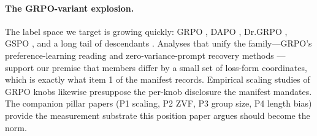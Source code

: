 \paragraph{The GRPO-variant explosion.} The label space we target is growing
quickly: GRPO \citep{shao2024deepseekmath, guo2025deepseekr1}, DAPO
\citep{yu2025dapo}, Dr.GRPO \citep{tong2025drgrpo}, GSPO \citep{qwen2025gspo},
and a long tail of descendants \citep{liu2026gdpo, nan2025ngrpo,
zhang2025scaffgrpo, lu2025grpolead, bytedance2025vapo}. Analyses that unify
the family---GRPO's preference-learning reading \citep{rafailov2024direct,
wu2025grpo_dpo} and zero-variance-prompt recovery methods \citep{le2025rlzvp}
---support our premise that members differ by a small set of loss-form
coordinates, which is exactly what item 1 of the manifest records. Empirical
scaling studies of GRPO knobs \citep{tan2025scalingrl} likewise presuppose
the per-knob disclosure the manifest mandates. The companion \ours{} pillar
papers (P1 scaling, P2 ZVF, P3 group size, P4 length bias) provide the
measurement substrate this position paper argues should become the norm.
